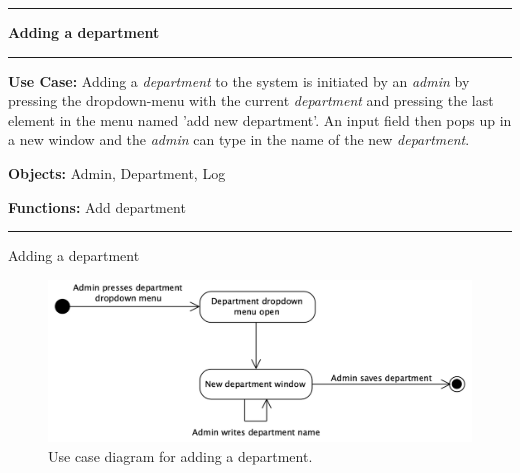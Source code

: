 
\begin{use_case}[H]
    \hrule
    \vskip 0.3cm
    \Large
    \begin{center}
    
        \textbf{Adding a department}
        
    \end{center}
    \vskip 0.1cm
    \hrule
    \vskip 0.2cm
    \normalsize
    
    \textbf{Use Case:} Adding a \textit{department} to the system is initiated by an \textit{admin} by pressing the dropdown-menu with the current \textit{department} and pressing the last element in the menu named 'add new department'. An input field then pops up in a new window and the \textit{admin} can type in the name of the new \textit{department}.
    
    \vskip 0.2cm
    
    \textbf{Objects:} Admin, Department, Log
    
    \vskip 0.2cm
    
    \textbf{Functions:} Add department
    
    \vskip 0.4cm
    \hrule
    \vskip 0.2cm
    \caption{Adding a department} \label{use_case:adding_a_department}
\end{use_case}

\begin{figure}[H]
    \centering
    \includegraphics[width=1.0\textwidth]{figures/AddDepartment.png}
    \caption{Use case diagram for adding a department.}
    \label{fig:UseCaseAddDepartment}
\end{figure}


